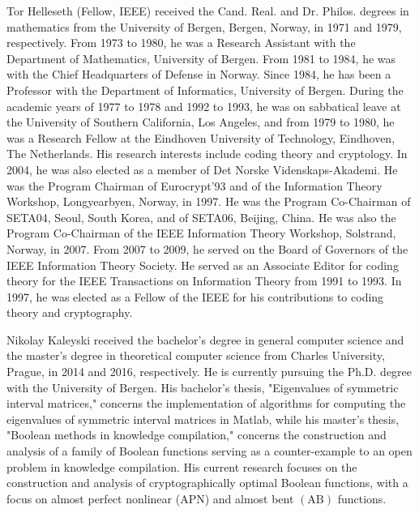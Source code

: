 \documentclass[10pt]{article}
\begin{document}
Tor Helleseth (Fellow, IEEE) received the Cand. Real. and Dr. Philos. degrees in mathematics from the University of Bergen, Bergen, Norway, in 1971 and 1979, respectively. From 1973 to 1980, he was a Research Assistant with the Department of Mathematics, University of Bergen. From 1981 to 1984, he was with the Chief Headquarters of Defense in Norway. Since 1984, he has been a Professor with the Department of Informatics, University of Bergen. During the academic years of 1977 to 1978 and 1992 to 1993, he was on sabbatical leave at the University of Southern California, Los Angeles, and from 1979 to 1980, he was a Research Fellow at the Eindhoven University of Technology, Eindhoven, The Netherlands. His research interests include coding theory and cryptology. In 2004, he was also elected as a member of Det Norske Videnskaps-Akademi. He was the Program Chairman of Eurocrypt'93 and of the Information Theory Workshop, Longyearbyen, Norway, in 1997. He was the Program Co-Chairman of SETA04, Seoul, South Korea, and of SETA06, Beijing, China. He was also the Program Co-Chairman of the IEEE Information Theory Workshop, Solstrand, Norway, in 2007. From 2007 to 2009, he served on the Board of Governors of the IEEE Information Theory Society. He served as an Associate Editor for coding theory for the IEEE Transactions on Information Theory from 1991 to 1993. In 1997, he was elected as a Fellow of the IEEE for his contributions to coding theory and cryptography.

Nikolay Kaleyski received the bachelor's degree in general computer science and the master's degree in theoretical computer science from Charles University, Prague, in 2014 and 2016, respectively. He is currently pursuing the Ph.D. degree with the University of Bergen. His bachelor's thesis, "Eigenvalues of symmetric interval matrices," concerns the implementation of algorithms for computing the eigenvalues of symmetric interval matrices in Matlab, while his master's thesis, "Boolean methods in knowledge compilation," concerns the construction and analysis of a family of Boolean functions serving as a counter-example to an open problem in knowledge compilation. His current research focuses on the construction and analysis of cryptographically optimal Boolean functions, with a focus on almost perfect nonlinear (APN) and almost bent $(\mathrm{AB})$ functions.
\end{document}
